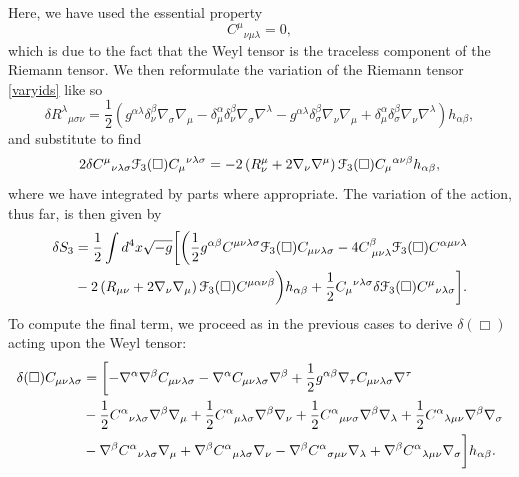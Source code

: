 Here, we have used the essential property 
\[
C^{\mu}{ }_{\nu\mu\lambda}=0
,\]
which is due to the fact that the Weyl tensor is the traceless component of the Riemann tensor. We then reformulate the variation of the Riemann tensor \eqref{varyids} like so
\[
\delta R^{\lambda}{ }_{\mu\sigma\nu}=\frac{1}{2}\left(g^{\alpha\lambda}\delta_{\nu}^{\beta}\nabla_{\sigma}\nabla_{\mu}-\delta_{\mu}^{\alpha}\delta_{\nu}^{\beta}\nabla_{\sigma}\nabla^{\lambda}-g^{\alpha\lambda}\delta_{\sigma}^{\beta}\nabla_{\nu}\nabla_{\mu}+\delta_{\mu}^{\alpha}\delta_{\sigma}^{\beta}\nabla_{\nu}\nabla^{\lambda}\right)h_{\alpha\beta}
, \]
and substitute to find
\[
2\delta C^{\mu}{ }_{\nu\lambda\sigma}{\cal F}_{3}(\Box)C_{\mu}{ }^{\nu\lambda\sigma}	=	-2\left(R_{\nu}^{\mu}+2\nabla_{\nu}\nabla^{\mu}\right){\cal F}_{3}(\Box)C_{\mu}{ }^{\alpha\nu\beta}h_{\alpha\beta},
  \]
where we have integrated by parts where appropriate. The variation of the action, thus far, is then given by
\begin{align}
\delta S_{3}	&=	\frac{1}{2}\int d^{4}x\sqrt{-g}\biggl[\biggl(\frac{1}{2}g^{\alpha\beta}C^{\mu\nu\lambda\sigma}{\cal F}_{3}(\Box)C_{\mu\nu\lambda\sigma}-4C_{\;\mu\nu\lambda}^{\beta}{\cal F}_{3}(\Box)C^{\alpha\mu\nu\lambda}
\nonumber\\&-2\left(R_{\mu\nu}+2\nabla_{\nu}\nabla_{\mu}\right){\cal F}_{3}(\Box)C^{\mu\alpha\nu\beta}\biggr)h_{\alpha\beta}+\frac{1}{2}C_{\mu}{ }^{\nu\lambda\sigma}\delta{\cal F}_{3}(\Box)C^{\mu}{ }_{\nu\lambda\sigma}\biggr].
 \end{align}
To compute the final term, we proceed as in the previous cases to derive $\delta(\Box)$ acting upon the Weyl tensor:
\begin{align}
\delta(\Box)C_{\mu\nu\lambda\sigma}	&=	\biggl[-\nabla^{\alpha}\nabla^{\beta}C_{\mu\nu\lambda\sigma}-\nabla^{\alpha}C_{\mu\nu\lambda\sigma}\nabla^{\beta}+\frac{1}{2}g^{\alpha\beta}\nabla_{\tau}C_{\mu\nu\lambda\sigma}\nabla^{\tau}
		\nonumber\\&-\frac{1}{2}C^{\alpha}{ }_{\nu\lambda\sigma}\nabla^{\beta}\nabla_{\mu}+\frac{1}{2}C^{\alpha}{ }_{\mu\lambda\sigma}\nabla^{\beta}\nabla_{\nu}+\frac{1}{2}C^{\alpha}{ }_{\mu\nu\sigma}\nabla^{\beta}\nabla_{\lambda}+\frac{1}{2}C^{\alpha}{ }_{\lambda\mu\nu}\nabla^{\beta}\nabla_{\sigma}
		\nonumber\\&-\nabla^{\beta}C^{\alpha}{ }_{\nu\lambda\sigma}\nabla_{\mu}+\nabla^{\beta}C^{\alpha}{ }_{\mu\lambda\sigma}\nabla_{\nu}-\nabla^{\beta}C^{\alpha}{ }_{\sigma\mu\nu}\nabla_{\lambda}+\nabla^{\beta}C^{\alpha}{ }_{\lambda\mu\nu}\nabla_{\sigma}\biggr]h_{\alpha\beta}.
 \end{align}
